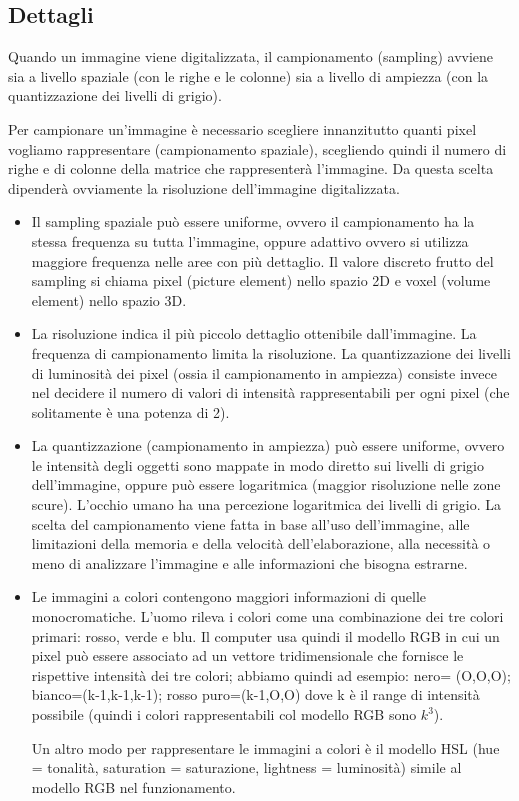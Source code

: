 \subsection{Dettagli}
Quando un immagine viene digitalizzata, il campionamento (sampling) avviene sia a livello spaziale (con le righe e le colonne) sia a livello di ampiezza (con la quantizzazione dei livelli di grigio).

Per campionare un'immagine è necessario scegliere innanzitutto quanti pixel vogliamo rappresentare (campionamento spaziale), scegliendo quindi il numero di righe e di colonne della matrice che rappresenterà l'immagine. Da questa scelta dipenderà ovviamente la risoluzione dell'immagine digitalizzata.

\begin{itemize}
\item Il sampling spaziale può essere uniforme, ovvero il campionamento ha la stessa frequenza su tutta l'immagine, oppure adattivo ovvero si utilizza maggiore frequenza nelle aree con più dettaglio. Il valore discreto frutto del sampling si chiama pixel (picture element) nello spazio 2D e voxel (volume element) nello spazio 3D.

\item La risoluzione indica il più piccolo dettaglio ottenibile dall'immagine. La frequenza di campionamento limita la risoluzione.
La quantizzazione dei livelli di luminosità dei pixel (ossia il campionamento in ampiezza) consiste invece nel decidere il numero di valori di intensità rappresentabili per ogni pixel (che solitamente è una potenza di 2).

\item La quantizzazione (campionamento in ampiezza) può essere uniforme, ovvero le intensità degli oggetti sono mappate in modo diretto sui livelli di grigio dell'immagine, oppure può essere logaritmica (maggior risoluzione nelle zone scure). L'occhio umano ha una percezione logaritmica dei livelli di grigio.
La scelta del campionamento viene fatta in base all'uso dell'immagine, alle limitazioni della memoria e della velocità dell'elaborazione, alla necessità o meno di analizzare l'immagine e alle informazioni che bisogna estrarne.

\item Le immagini a colori contengono maggiori informazioni di quelle monocromatiche. L'uomo rileva i colori come una combinazione dei tre colori primari: rosso, verde e blu. Il computer usa quindi il modello RGB in cui un pixel può essere associato ad un vettore tridimensionale che fornisce le
rispettive intensità dei tre colori; abbiamo quindi ad esempio: nero= (O,O,O); bianco=(k-1,k-1,k-1); rosso puro=(k-1,O,O) dove k è il range di intensità possibile (quindi i colori rappresentabili col modello RGB sono $k^3$).

Un altro modo per rappresentare le immagini a colori è il modello HSL (hue = tonalità, saturation = saturazione, lightness = luminosità) simile al modello RGB nel funzionamento.
\end{itemize}

